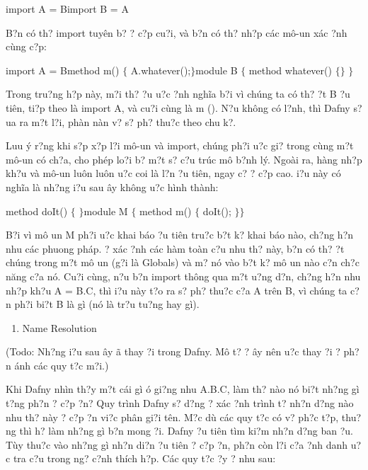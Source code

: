 \documentclass{article} %
\begin{document}
\noindent import A = Bimport B = A

\noindent 

\noindent B?n c\'{o} th? import tuy\^{e}n b? ? c?p cu?i, v\`{a} b?n c\'{o} th? nh?p c\'{a}c m\^{o}-{\dj}un x\'{a}c {\dj}?nh c\`{u}ng c?p:

\noindent import A = Bmethod m() $\{$  A.whatever();$\}$module B $\{$ method whatever() $\{$$\}$ $\}$

\noindent 

Trong tru?ng h?p n\`{a}y, m?i th? {\dj}?u {\dj}u?c {\dj}?nh ngh\~{i}a b?i v\`{i} ch\'{u}ng ta c\'{o} th? {\dj}?t B {\dj}?u ti\^{e}n, ti?p theo l\`{a} import A, v\`{a} cu?i c\`{u}ng l\`{a} m (). N?u kh\^{o}ng c\'{o} l?nh, th\`{i} Dafny s? {\dj}ua ra m?t l?i, ph\`{a}n n\`{a}n v? s? ph? thu?c theo chu k?.

Luu \'{y} r?ng khi s?p x?p l?i m\^{o}-{\dj}un v\`{a} import, ch\'{u}ng ph?i {\dj}u?c gi? trong c\`{u}ng m?t m\^{o}-{\dj}un c\'{o} ch?a, cho ph\'{e}p lo?i b? m?t s? c?u tr\'{u}c m\^{o} b?nh l\'{y}. Ngo\`{a}i ra, h\`{a}ng nh?p kh?u v\`{a} m\^{o}-{\dj}un lu\^{o}n lu\^{o}n {\dj}u?c coi l\`{a} l?n {\dj}?u ti\^{e}n, ngay c? ? c?p cao. {\DJ}i?u n\`{a}y c\'{o} ngh\~{i}a l\`{a} nh?ng {\dj}i?u sau {\dj}\^{a}y kh\^{o}ng {\dj}u?c h\`{i}nh th\`{a}nh:

\noindent method doIt() $\{$ $\}$module M $\{$  method m() $\{$    doIt();  $\}$$\}$

B?i v\`{i} m\^{o} {\dj}un M ph?i {\dj}u?c khai b\'{a}o {\dj}?u ti\^{e}n tru?c b?t k? khai b\'{a}o n\`{a}o, ch?ng h?n nhu c\'{a}c phuong ph\'{a}p. {\DJ}? x\'{a}c {\dj}?nh c\'{a}c h\`{a}m to\`{a}n c?u nhu th? n\`{a}y, b?n c\'{o} th? {\dj}?t ch\'{u}ng trong m?t m\^{o} {\dj}un (g?i l\`{a} Globals) v\`{a} m? n\'{o} v\`{a}o b?t k? m\^{o} {\dj}un n\`{a}o c?n ch?c n\u{a}ng c?a n\'{o}. Cu?i c\`{u}ng, n?u b?n import th\^{o}ng qua m?t {\dj}u?ng d?n, ch?ng h?n nhu nh?p kh?u A = B.C, th\`{i} {\dj}i?u n\`{a}y t?o ra s? ph? thu?c c?a A tr\^{e}n B, v\`{i} ch\'{u}ng ta c?n ph?i bi?t B l\`{a} g\`{i} (n\'{o} l\`{a} tr?u tu?ng hay g\`{i}).

\begin{enumerate}
\item  Name Resolution\underbar{}
\end{enumerate}

\noindent (Todo: Nh?ng {\dj}i?u sau {\dj}\^{a}y {\dj}\~{a} thay {\dj}?i trong Dafny. M\^{o} t? ? {\dj}\^{a}y n\^{e}n {\dj}u?c thay {\dj}?i {\dj}? ph?n \'{a}nh c\'{a}c quy t?c m?i.)

Khi Dafny nh\`{i}n th?y m?t c\'{a}i g\`{i} {\dj}\'{o} gi?ng nhu A.B.C, l\`{a}m th? n\`{a}o n\'{o} bi?t nh?ng g\`{i} t?ng ph?n {\dj}? c?p {\dj}?n? Quy tr\`{i}nh Dafny s? d?ng {\dj}? x\'{a}c {\dj}?nh tr\`{i}nh t? nh?n d?ng n\`{a}o nhu th? n\`{a}y {\dj}? c?p {\dj}?n vi?c ph\^{a}n gi?i t\^{e}n. M?c d\`{u} c\'{a}c quy t?c c\'{o} v? ph?c t?p, thu?ng th\`{i} h? l\`{a}m nh?ng g\`{i} b?n mong {\dj}?i. Dafny {\dj}?u ti\^{e}n t\`{i}m ki?m nh?n d?ng ban {\dj}?u. T\`{u}y thu?c v\`{a}o nh?ng g\`{i} nh?n di?n {\dj}?u ti\^{e}n {\dj}? c?p {\dj}?n, ph?n c\`{o}n l?i c?a {\dj}?nh danh {\dj}u?c tra c?u trong ng? c?nh th\'{i}ch h?p. C\'{a}c quy t?c {\dj}?y {\dj}? nhu sau:
\end{document}
